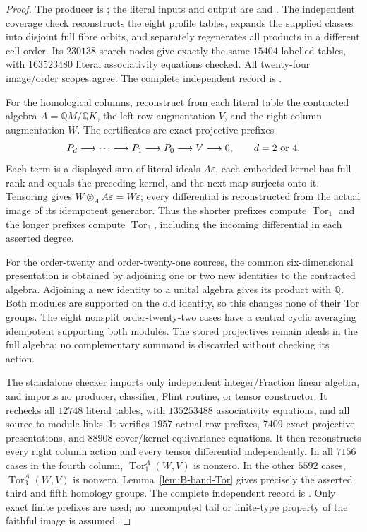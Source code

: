\begin{proof}
The producer is ; the
literal inputs and output are
 and
.
The independent coverage check reconstructs the eight profile
tables, expands the supplied classes into disjoint full fibre
orbits, and separately regenerates all products in a different
cell order. Its $230138$ search nodes give exactly the same
$15404$ labelled tables, with $163523480$ literal associativity
equations checked. All twenty-four image/order scopes agree.
The complete independent record is
.

For the homological columns, reconstruct from each literal table
the contracted algebra $A=\mathbb QM/\mathbb QK$, the left row
augmentation $V$, and the right column augmentation $W$.
The certificates are exact projective prefixes
\[
 P_d\longrightarrow\cdots\longrightarrow P_1
 \longrightarrow P_0\longrightarrow V\longrightarrow0,
 \qquad d=2\ \hbox{or}\ 4.
\]
Each term is a displayed sum of literal ideals $A\varepsilon$,
each embedded kernel has full rank and equals the preceding
kernel, and the next map surjects onto it. Tensoring gives
$W\otimes_A A\varepsilon=W\varepsilon$; every differential is
reconstructed from the actual image of its idempotent generator.
Thus the shorter prefixes compute $\operatorname{Tor}_1$ and
the longer prefixes compute $\operatorname{Tor}_3$, including
the incoming differential in each asserted degree.

For the order-twenty and order-twenty-one sources, the common
six-dimensional presentation is obtained by adjoining one or
two new identities to the contracted algebra. Adjoining a new
identity to a unital algebra gives its product with $\mathbb Q$.
Both modules are supported on the old identity, so this changes
none of their Tor groups. The eight nonsplit order-twenty-two
cases have a central cyclic averaging idempotent supporting
both modules. The stored projectives remain ideals in the full
algebra; no complementary summand is discarded without checking
its action.

The standalone checker
 imports only
independent integer/Fraction linear algebra, and imports no
producer, classifier, Flint routine, or tensor constructor.
It rechecks all $12748$ literal tables, with $135253488$
associativity equations, and all source-to-module links. It
verifies $1957$ actual row prefixes, $7409$ exact projective
presentations, and $88908$ cover/kernel equivariance equations.
It then reconstructs every right column action and every tensor
differential independently. In all $7156$ cases in the fourth
column, $\operatorname{Tor}_1^A(W,V)$ is nonzero. In the other
$5592$ cases, $\operatorname{Tor}_3^A(W,V)$ is nonzero.
Lemma~\ref{lem:B-band-Tor} gives precisely the asserted third
and fifth homology groups. The complete independent record is
.
Only exact finite prefixes are used; no uncomputed tail or
finite-type property of the faithful image is assumed.
\end{proof}

